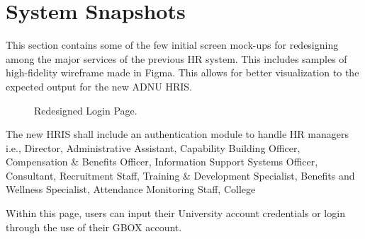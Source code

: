 \section{System Snapshots}

This section contains some of the few initial screen mock-ups for redesigning among the major services of the previous HR system. This includes samples of high-fidelity wireframe made in Figma. This allows for better visualization to the expected output for the new ADNU HRIS.

    \begin{figure}[H]
        \centering
        \caption{Redesigned Login Page.}
        \label{fig:app-login}
    \end{figure}

    The new HRIS shall include an authentication module to handle HR managers i.e., Director, Administrative Assistant, Capability Building Officer, Compensation \& Benefits Officer, Information Support Systems Officer, Consultant, Recruitment Staff, Training \& Development Specialist, Benefits and Wellness Specialist, Attendance Monitoring Staff, College
    
    Within this page, users can input their University account credentials or login through the use of their GBOX account.

